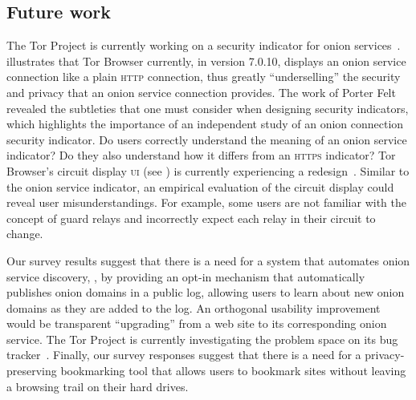 \subsection{Future work}
\label{sec:future-work}

The Tor Project is currently working on a security indicator for onion
services~\cite{trac23247}.   illustrates that Tor
Browser currently, in version 7.0.10, displays an onion service connection like
a plain \textsc{http} connection, thus greatly ``underselling'' the security and
privacy that an onion service connection provides.  The work of Porter Felt
\ea~\cite{Felt2016a} revealed the subtleties that one must consider when
designing security indicators, which highlights the importance of an independent
study of an onion connection security indicator.  Do users correctly understand
the meaning of an onion service indicator?  Do they also understand how it
differs from an \textsc{https} indicator?  Tor Browser's circuit display
\textsc{ui} (see ) is currently experiencing a
redesign~\cite{trac24309}.  Similar to the onion service indicator, an empirical
evaluation of the circuit display could reveal user misunderstandings.  For
example, some users are not familiar with the concept of guard relays and
incorrectly expect each relay in their circuit to change.

Our survey results suggest that there is a need for a system that automates
onion service discovery, \eg, by providing an opt-in mechanism that
automatically publishes onion domains in a public log, allowing users to learn
about new onion domains as they are added to the log.  An orthogonal usability
improvement would be transparent ``upgrading'' from a web site to its
corresponding onion service.  The Tor Project is currently investigating the
problem space on its bug tracker~\cite{trac21952}.  Finally, our survey
responses suggest that there is a need for a privacy-preserving bookmarking tool
that allows users to bookmark sites without leaving a browsing trail on their
hard drives.
